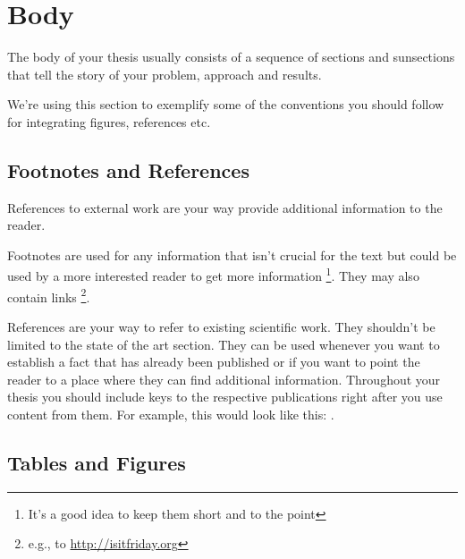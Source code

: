 \section{Body} \label{sec:body}


The body of your thesis usually consists of a sequence of sections and sunsections that tell the story of your problem, approach and results. 

We're using this section to exemplify some of the conventions you should follow for integrating figures, references etc.







\subsection{Footnotes and References} \label{sec:body_refs}

References to external work are your way provide additional information to the reader.

Footnotes are used for any information that isn't crucial for the text but could be used by a more interested reader to get more information \footnote{It's a good idea to keep them short and to the point}. They may also contain links \footnote{e.g., to \url{http://isitfriday.org}}.

References are your way to refer to existing scientific work. They shouldn't be limited to the state of the art section. They can be used whenever you want to establish a fact that has already been published or if you want to point the reader to a place where they can find additional information.
Throughout your thesis you should include keys to the respective publications right after you use content from them. For example, this would look like this: \cite{greenwade93} \cite{einstein} .


\subsection{Tables and Figures} \label{sec:body_tables}

